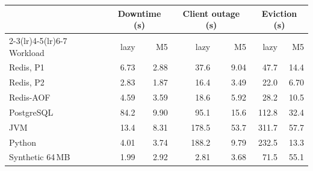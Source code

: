 \begin{tabular}{lrrrrrr}
\toprule
 & \multicolumn{2}{c}{Downtime (s)} & \multicolumn{2}{c}{Client outage (s)} & \multicolumn{2}{c}{Eviction (s)} \\
\cmidrule(lr){2-3}\cmidrule(lr){4-5}\cmidrule(lr){6-7}
Workload & lazy & M5 & lazy & M5 & lazy & M5 \\
\midrule
Redis, P1 & 6.73 & 2.88 & 37.6 & 9.04 & 47.7 & 14.4 \\
Redis, P2 & 2.83 & 1.87 & 16.4 & 3.49 & 22.0 & 6.70 \\
Redis-AOF & 4.59 & 3.59 & 18.6 & 5.92 & 28.2 & 10.5 \\
PostgreSQL & 84.2 & 9.90 & 95.1 & 15.6 & 112.8 & 32.4 \\
JVM & 13.4 & 8.31 & 178.5 & 53.7 & 311.7 & 57.7 \\
Python & 4.01 & 3.74 & 188.2 & 9.79 & 232.5 & 13.3 \\
Synthetic 64\,MB & 1.99 & 2.92 & 2.81 & 3.68 & 71.5 & 55.1 \\
\bottomrule
\end{tabular}
